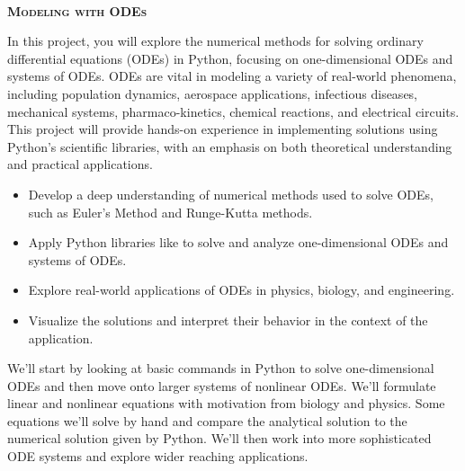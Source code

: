 \documentclass[article, 11pt]{article}
\begin{document}
\begin{center}\\
\Huge{\textbf{\textsc{ Modeling with ODEs}}} \\ \end{center}

\vspace{.6cm}

\noindent {}

\vspace{-.35cm}
\noindent \hrulefill

In this project, you will explore the numerical methods for solving ordinary differential equations (ODEs) in Python, focusing on one-dimensional ODEs and systems of ODEs. ODEs are vital in modeling a variety of real-world phenomena, including population dynamics, aerospace applications, infectious diseases, mechanical systems, pharmaco-kinetics, chemical reactions, and electrical circuits. This project will provide hands-on experience in implementing solutions using Python’s scientific libraries, with an emphasis on both theoretical understanding and practical applications.  \\ 


\noindent {}

\vspace{-.35cm}
\noindent \hrulefill

\begin{itemize}
\item Develop a deep understanding of numerical methods used to solve ODEs, such as Euler’s Method and Runge-Kutta methods.
\item Apply Python libraries like  to solve and analyze one-dimensional ODEs and systems of ODEs.
\item Explore real-world applications of ODEs in physics, biology, and engineering.
\item Visualize the solutions and interpret their behavior in the context of the application.
\end{itemize}

\noindent {}

\vspace{-.35cm}
\noindent \hrulefill

We'll start by looking at basic commands in Python to solve one-dimensional ODEs and then move onto larger systems of nonlinear ODEs. We'll formulate linear and nonlinear equations with motivation from biology and physics.  Some equations we'll solve by hand and compare the analytical solution to the numerical solution given by Python.  We'll then work into more sophisticated ODE systems and explore wider reaching applications.   \\
\end{document}
